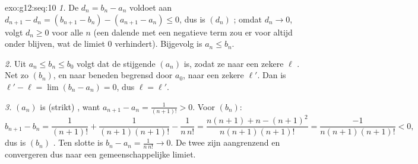 \begin{solution}{exo:g12:seq:10}
\emph{1.} De  $d_n = b_n - a_n$ voldoet aan
$d_{n+1} - d_n = (b_{n+1} - b_n) - (a_{n+1} - a_n) \leq 0$, dus is $(d_n)$
; omdat $d_n \to 0$, volgt $d_n \geq 0$ voor alle $n$ (een dalende 
met een negatieve term zou er voor altijd onder blijven, wat de limiet $0$
verhindert). Bijgevolg is $a_n \leq b_n$.

\emph{2.} Uit $a_n \leq b_n \leq b_0$ volgt dat de stijgende  $(a_n)$
 is, zodat ze naar een zekere $\ell$ . Net zo
 $(b_n)$,  en naar beneden begrensd door $a_0$, naar een
zekere $\ell'$. Dan is $\ell' - \ell = \lim (b_n - a_n) = 0$, dus
$\ell = \ell'$.

\emph{3.} $(a_n)$ is (strikt) , want
$a_{n+1} - a_n = \frac{1}{(n+1)!} > 0$. Voor $(b_n)$:
\[
b_{n+1} - b_n = \frac{1}{(n+1)!} + \frac{1}{(n+1)(n+1)!} - \frac{1}{n\,n!}
= \frac{n(n+1) + n - (n+1)^2}{n(n+1)(n+1)!}
= \frac{-1}{n(n+1)(n+1)!} < 0 ,
\]
dus is $(b_n)$ . Ten slotte is $b_n - a_n = \frac{1}{n\,n!} \to 0$. De
twee  zijn aangrenzend en convergeren dus naar een gemeenschappelijke
limiet.
\end{solution}

